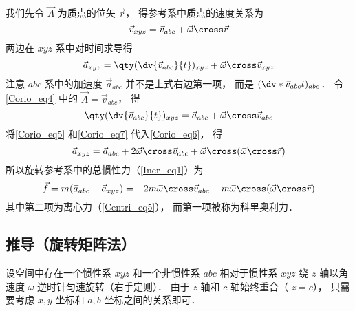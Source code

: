 我们先令 $\vec A$ 为质点的位矢 $\vec r$， 得参考系中质点的速度关系为
\begin{equation}\label{Corio_eq5}
\vec v_{xyz} = \vec v_{abc} + \vec\omega\cross\vec r
\end{equation}
两边在 $xyz$ 系中对时间求导得
\begin{equation}\label{Corio_eq6}
\vec a_{xyz} = \qty(\dv{\vec v_{abc}}{t})_{xyz} + \vec\omega\cross\vec v_{xyz}
\end{equation}
注意 $abc$ 系中的加速度 $\vec a_{abc}$ 并不是上式右边第一项， 而是 $(\dv*{\vec v_{abc}}{t})_{abc}$． 令\autoref{Corio_eq4} 中的 $\vec A = \vec v_{abc}$， 得
\begin{equation}\label{Corio_eq7}
\qty(\dv{\vec v_{abc}}{t})_{xyz} = \vec a_{abc} + \vec\omega\cross\vec v_{abc}
\end{equation}
将\autoref{Corio_eq5} 和\autoref{Corio_eq7} 代入\autoref{Corio_eq6}， 得
\begin{equation}
\vec a_{xyz} = \vec a_{abc} + 2\vec\omega\cross\vec v_{abc} + \vec\omega\cross(\vec\omega\cross\vec r)
\end{equation}
所以旋转参考系中的总惯性力（\autoref{Iner_eq1}）为
\begin{equation}
\vec f = m(\vec a_{abc} - \vec a_{xyz}) = -2m\vec\omega\cross\vec v_{abc} - m\vec\omega\cross(\vec\omega\cross\vec r)
\end{equation}
其中第二项为离心力（\autoref{Centri_eq5}）， 而第一项被称为科里奥利力．

\subsection{推导（旋转矩阵法）}
设空间中存在一个惯性系 $xyz$ 和一个非惯性系 $abc$ 相对于惯性系 $xyz$ 绕 $z$ 轴以角速度 $\omega$ 逆时针匀速旋转（右手定则）． 由于 $z$ 轴和 $c$ 轴始终重合（ $z=c$）， 只需要考虑 $x,y$ 坐标和 $a,b$ 坐标之间的关系即可．

